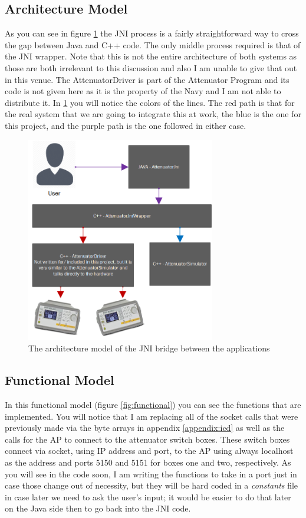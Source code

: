 \documentclass [a4paper,12pt,oneside,final,titlepage]{article}
\begin{document}
	\subsection{Architecture Model}
	As you can see in figure \ref{fig:overview} the JNI process is a fairly straightforward way to cross the gap between Java and C++ code. The only middle process required is that of the JNI wrapper. Note that this is not the entire architecture of both systems as those are both irrelevant to this discussion and also I am unable to give that out in this venue. The AttenuatorDriver is part of the Attenuator Program and its code is not given here as it is the property of the Navy and I am not able to distribute it. In \ref{fig:overview} you will notice the colors of the lines. The red path is that for the real system that we are going to integrate this at work, the blue is the one for this project, and the purple path is the one followed in either case. 
	\begin{figure}[htp]
		\centering
		\includegraphics[height=90mm]{overview}
		\caption{The architecture model of the JNI bridge between the applications}
		\label{fig:overview}
	\end{figure}

	\subsection{Functional Model}
	In this functional model (figure \ref{fig:functional}) you can see the functions that are implemented. You will notice that I am replacing all of the socket calls that were previously made via the byte arrays in appendix \ref{appendix:icd} as well as the calls for the AP to connect to the attenuator switch boxes. These switch boxes connect via socket, using IP address and port, to the AP using always localhost as the address and ports 5150 and 5151 for boxes one and two, respectively. As you will see in the code soon, I am writing the functions to take in a port just in case those change out of necessity, but they will be hard coded in a \emph{constants} file in case later we need to ask the user's input; it would be easier to do that later on the Java side then to go back into the JNI code.
	
\end{document}
